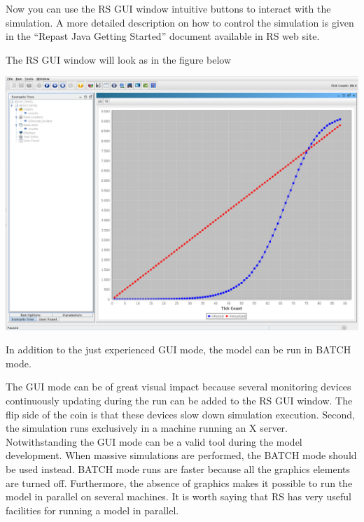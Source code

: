 \documentclass{article}
\begin{document}
Now you can use the RS GUI window intuitive buttons to interact with the simulation. A more detailed description on how to control the simulation is given in the ``Repast Java Getting Started'' document available in RS web site.

The RS GUI window will look as in the figure below 

\noindent
\includegraphics[scale=0.2]{fig_abseir_family_rs_gui1}



In addition to the just experienced GUI mode, the model can be run in BATCH mode. 

The GUI mode can be of great visual impact because several monitoring devices continuously updating during the run can be added to the RS GUI window. The flip side of the coin is that these devices slow down simulation execution. Second, the simulation runs exclusively in a machine running an X server. Notwithstanding the GUI mode can be a valid tool during the model development. When massive simulations are performed, the BATCH mode should be used instead. BATCH mode runs are faster because all the graphics elements are turned off. Furthermore, the absence of graphics makes it possible to run the model in parallel on several machines. It is worth saying that RS has very useful facilities for running a model in parallel.
\end{document}
